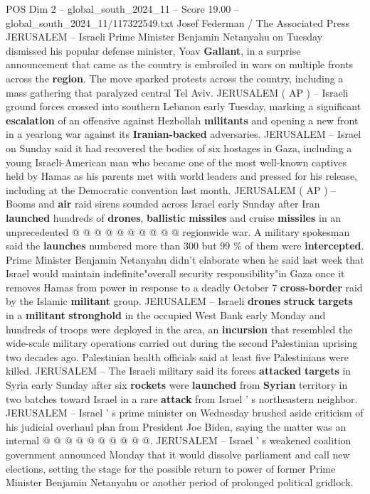 \begin{textsample}{POS Dim 2 – global\_south\_2024\_11 – Score 19.00 – global\_south\_2024\_11/117322549.txt}  \label{ex:f2_pos_177}
Josef Federman / The Associated Press JERUSALEM -- Israeli Prime Minister Benjamin Netanyahu on Tuesday dismissed his popular defense minister, Yoav \textbf{Gallant}, in a surprise announcement that came as the country is embroiled in wars on multiple fronts across the \textbf{region}.
The move sparked protests across the country, including a mass gathering that paralyzed central Tel Aviv.
JERUSALEM ( AP ) -- Israeli ground forces crossed into southern Lebanon early Tuesday, marking a significant \textbf{escalation} of an offensive against Hezbollah \textbf{militants} and opening a new front in a yearlong war against its \textbf{Iranian-backed} adversaries.
JERUSALEM -- Israel on Sunday said it had recovered the bodies of six hostages in Gaza, including a young Israeli-American man who became one of the most well-known captives held by Hamas as his parents met with world leaders and pressed for his release, including at the Democratic convention last month.
JERUSALEM ( AP ) -- Booms and \textbf{air} raid sirens sounded across Israel early Sunday after Iran \textbf{launched} hundreds of \textbf{drones}, \textbf{ballistic} \textbf{missiles} and cruise \textbf{missiles} in an unprecedented @ @ @ @ @ @ @ @ @ @ regionwide war.
A military spokesman said the \textbf{launches} numbered more than 300 but 99 \% of them were \textbf{intercepted}.
Prime Minister Benjamin Netanyahu didn't elaborate when he said last week that Israel would maintain indefinite"overall security responsibility"in Gaza once it removes Hamas from power in response to a deadly October 7 \textbf{cross-border} raid by the Islamic \textbf{militant} group.
JERUSALEM -- Israeli \textbf{drones} \textbf{struck} \textbf{targets} in a \textbf{militant} \textbf{stronghold} in the occupied West Bank early Monday and hundreds of troops were deployed in the area, an \textbf{incursion} that resembled the wide-scale military operations carried out during the second Palestinian uprising two decades ago.
Palestinian health officials said at least five Palestinians were killed.
JERUSALEM -- The Israeli military said its forces \textbf{attacked} \textbf{targets} in Syria early Sunday after six \textbf{rockets} were \textbf{launched} from \textbf{Syrian} territory in two batches toward Israel in a rare \textbf{attack} from Israel ' s northeastern neighbor.
JERUSALEM -- Israel ' s prime minister on Wednesday brushed aside criticism of his judicial overhaul plan from President Joe Biden, saying the matter was an internal @ @ @ @ @ @ @ @ @ @.
JERUSALEM -- Israel ' s weakened coalition government announced Monday that it would dissolve parliament and call new elections, setting the stage for the possible return to power of former Prime Minister Benjamin Netanyahu or another period of prolonged political gridlock.

\end{textsample}
